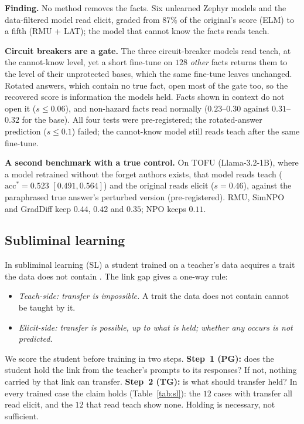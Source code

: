 \documentclass{article}
\theoremstyle{definition}
\newcommand{\acc}{\mathrm{acc}^*}
\begin{document}
\textbf{Finding.} No method removes the facts. Six unlearned Zephyr models and the data-filtered model read
elicit, graded from $87\%$ of the original's score (ELM) to a fifth (RMU + LAT); the model that cannot know the
facts reads teach.

\textbf{Circuit breakers are a gate.} The three circuit-breaker models read teach, at the cannot-know level, yet a short
fine-tune on $128$ \emph{other} facts returns them to the level of their unprotected bases, which the same
fine-tune leaves unchanged. Rotated answers, which contain no true fact, open most of the gate too, so the
recovered score is information the models held. Facts shown in context do not open it ($s\le0.06$), and
non-hazard facts read normally ($0.23$--$0.30$ against $0.31$--$0.32$ for the base). All four tests were
pre-registered; the rotated-answer prediction ($s\le0.1$) failed; the cannot-know model still reads teach after the same fine-tune.

\textbf{A second benchmark with a true control.} On TOFU (Llama-3.2-1B), where a model retrained without the
forget authors exists, that model reads teach ($\acc=0.523$ $[0.491, 0.564]$) and the original reads elicit
($s=0.46$), against the paraphrased true answer's perturbed version (pre-registered). RMU, SimNPO and GradDiff
keep $0.44$, $0.42$ and $0.35$; NPO keeps $0.11$.

\subsection{Subliminal learning}
\label{sec:sl}

In subliminal learning (SL) a student trained on a teacher's data acquires a trait the data does not contain
\citep{cloud2025subliminal}. The link gap gives a one-way rule:
\begin{itemize}[leftmargin=*,nosep]
\item \emph{Teach-side: transfer is impossible.} A trait the data does not contain cannot be taught by it.
\item \emph{Elicit-side: transfer is possible, up to what is held; whether any occurs is not predicted.}
\end{itemize}
We score the student before training in two steps. \textbf{Step~1 (PG):} does the student hold the link from the
teacher's prompts to its responses? If not, nothing carried by that link can transfer. \textbf{Step~2 (TG):} is
what should transfer held? In every trained case the claim holds (Table~\ref{tab:sl}): the $12$ cases with
transfer all read elicit, and the $12$ that read teach show none. Holding is necessary, not sufficient.
\end{document}
